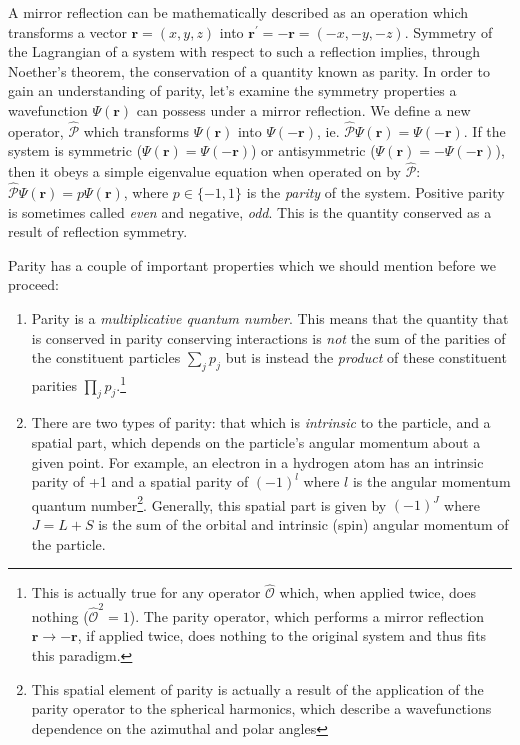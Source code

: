 \documentclass[a4paper,12pt]{book}
\begin{document}
A mirror reflection can be mathematically described as an operation which transforms a vector $\mathbf{r}=(x,y,z)$ 
into 
$\mathbf{r^{'}}=-\mathbf{r}=(-x,-y,-z)$. 
Symmetry of the Lagrangian of a system with respect to such a reflection implies, through Noether's theorem, the conservation of a quantity known as parity. In order to gain an understanding of parity, let's examine the symmetry properties a wavefunction 
$\Psi(\mathbf{r})$ 
can possess under a mirror reflection. We define a new operator, 
$\hat{\mathcal{P}}$ 
which transforms 
$\Psi(\mathbf{r})$
into 
$\Psi(-\mathbf{r})$,
ie. $\hat{\mathcal{P}}\Psi(\mathbf{r})=\Psi(-\mathbf{r})$.
If the system is symmetric ($\Psi(\mathbf{r})=\Psi(-\mathbf{r})$) or antisymmetric ($\Psi(\mathbf{r})=-\Psi(-\mathbf{r})$), then it obeys a simple eigenvalue equation when operated on by $\hat{\mathcal{P}}$: $\hat{\mathcal{P}}\Psi(\mathbf{r})=p\Psi(\mathbf{r})$, where $p\in \{-1,1\}$ is the \emph{parity} of the system\cite{brandt}. Positive parity is sometimes called \emph{even} and negative, \emph{odd}. This is the quantity conserved as a result of reflection symmetry.

Parity has a couple of important properties which we should mention before we proceed:

\begin{enumerate}

\label{list 1}

\item Parity is a \emph{multiplicative quantum number}. This means that the quantity that is conserved in parity conserving interactions is \emph{not} the sum of the parities of the constituent particles
$\displaystyle\sum_{j} p_j$
but is instead the \emph{product} of these constituent parities $\displaystyle\prod_{j} p_j$.\footnote{This is actually true for any operator $\hat{\mathcal{O}}$ which, when applied twice, does nothing ($\hat{\mathcal{O}}^{2}=1$). The parity operator, which performs a mirror reflection $\mathbf{r}\longrightarrow -\mathbf{r}$, if applied twice, does nothing to the original system and thus fits this paradigm.}\cite{Hamermesh}

\item There are two types of parity: that which is \emph{intrinsic} to the particle, and a spatial part, which depends on the particle's angular momentum about a given point. For example, an electron in a hydrogen atom has an intrinsic parity of +1 and a spatial parity of $(-1)^{l}$ where $l$ is the angular momentum quantum number\footnote{This spatial element of parity is actually a result of the application of the parity operator to the spherical harmonics, which describe a wavefunctions dependence on the azimuthal and polar angles}. Generally, this spatial part is given by $(-1)^{J}$ where $J=L+S$ is the sum of the orbital and intrinsic (spin) angular momentum of the particle.

\end{enumerate} 
\end{document}
